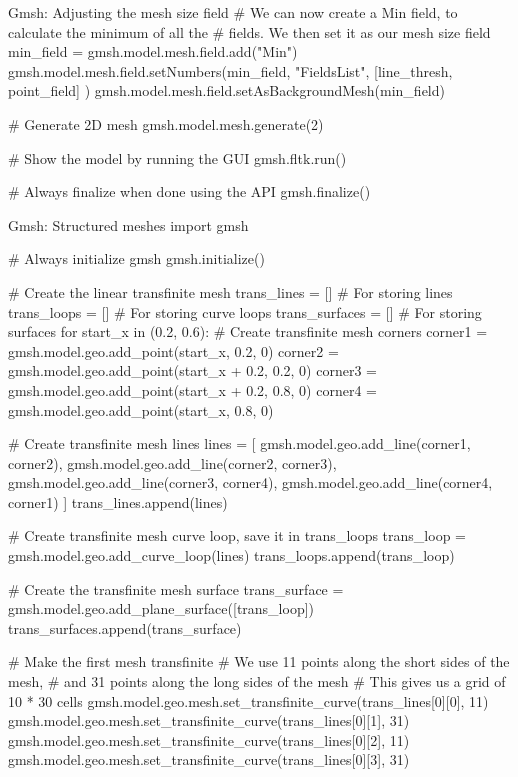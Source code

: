 \begin{python}[label=py:Gmshfield, float=htp, breakable]{Gmsh: Adjusting the mesh size field}
# We can now create a Min field, to calculate the minimum of all the
# fields. We then set it as our mesh size field
min_field = gmsh.model.mesh.field.add("Min")
gmsh.model.mesh.field.setNumbers(min_field, "FieldsList",
    [line_thresh, point_field]
)
gmsh.model.mesh.field.setAsBackgroundMesh(min_field)

# Generate 2D mesh
gmsh.model.mesh.generate(2)

# Show the model by running the GUI
gmsh.fltk.run()

# Always finalize when done using the API
gmsh.finalize()
\end{python}


\begin{python}[label=py:Gmshtransfinite, float=htp, breakable]{Gmsh: Structured meshes}
import gmsh

# Always initialize gmsh
gmsh.initialize()

# Create the linear transfinite mesh
trans_lines = []        # For storing lines
trans_loops = []        # For storing curve loops
trans_surfaces = []     # For storing surfaces
for start_x in (0.2, 0.6):
    # Create transfinite mesh corners
    corner1 = gmsh.model.geo.add_point(start_x, 0.2, 0)
    corner2 = gmsh.model.geo.add_point(start_x + 0.2, 0.2, 0)
    corner3 = gmsh.model.geo.add_point(start_x + 0.2, 0.8, 0)
    corner4 = gmsh.model.geo.add_point(start_x, 0.8, 0)

    # Create transfinite mesh lines
    lines = [
        gmsh.model.geo.add_line(corner1, corner2),
        gmsh.model.geo.add_line(corner2, corner3),
        gmsh.model.geo.add_line(corner3, corner4),
        gmsh.model.geo.add_line(corner4, corner1)
    ]
    trans_lines.append(lines)
    
    # Create transfinite mesh curve loop, save it in trans_loops
    trans_loop = gmsh.model.geo.add_curve_loop(lines)
    trans_loops.append(trans_loop)

    # Create the transfinite mesh surface
    trans_surface = gmsh.model.geo.add_plane_surface([trans_loop])
    trans_surfaces.append(trans_surface)

# Make the first mesh transfinite
# We use 11 points along the short sides of the mesh,
# and 31 points along the long sides of the mesh
# This gives us a grid of 10 * 30 cells
gmsh.model.geo.mesh.set_transfinite_curve(trans_lines[0][0], 11)
gmsh.model.geo.mesh.set_transfinite_curve(trans_lines[0][1], 31)
gmsh.model.geo.mesh.set_transfinite_curve(trans_lines[0][2], 11)
gmsh.model.geo.mesh.set_transfinite_curve(trans_lines[0][3], 31)


\end{python}
